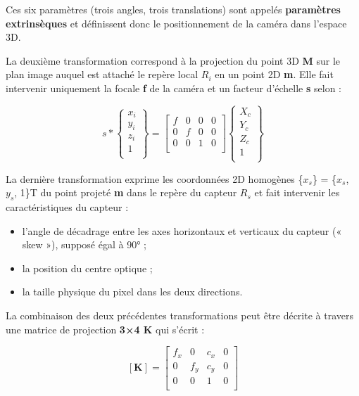   
 Ces six paramètres (trois angles, trois translations) sont appelés \textbf{paramètres extrinsèques} et définissent donc le positionnement de la caméra dans l’espace 3D.
 
 La deuxième transformation correspond à la projection du point 3D \textbf{M} sur le plan image auquel est attaché le repère local \textbf{$R_i$} en un point 2D \textbf{m}. Elle fait intervenir uniquement la focale \textbf{f} de la caméra et un facteur d’échelle \textbf{s} selon : 
 
 \begin{equation}
 s
 *
 \left\{
 \begin{array}{c}
 	x_i \\
 	y_i \\
 	z_i \\
 	1 \\
 \end{array}
 \right\}
 =
 \left[ 
  \begin{array}{cccc}
 	f & 0 & 0 & 0 \\
 	0 & f & 0 & 0 \\
 	0 & 0 & 1 & 0\\
 \end{array}
  \right]
  \left\{
  \begin{array}{c}
  	X_c \\
  	Y_c\\
  	Z_c \\
  	1 \\
  \end{array}
  \right\} 
\end{equation}
   
 La dernière transformation exprime les coordonnées 2D homogènes \{$x_s$\} = \{$x_s$, $y_s$, 1\}T du point projeté \textbf{m} dans le repère du capteur $R_s$ et fait intervenir les caractéristiques du capteur : 
 
 \begin{itemize}
 	\item l’angle de décadrage entre les axes horizontaux et verticaux du capteur (« skew »), supposé égal à 90° ;
 	\item la position du centre optique ;
 	\item la taille physique du pixel dans les deux directions.
 \end{itemize}
  
  La combinaison des deux précédentes transformations peut être décrite à travers une matrice de projection \textbf{3×4 K} qui s’écrit :
  
  \begin{equation}
  \left[ \textbf{K} \right] 
  =
  \left[ 
  \begin{array}{cccc}
  	f_x & 0 & c_x & 0 \\
  	0 & f_y & c_y & 0 \\
  	0 & 0 & 1 & 0\\
  \end{array}
  \right]
\end{equation}
  

